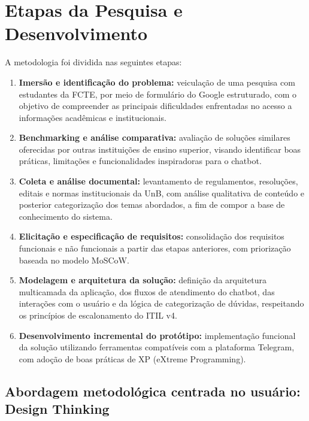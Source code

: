 \section{Etapas da Pesquisa e Desenvolvimento}

A metodologia foi dividida nas seguintes etapas:

\begin{enumerate}
    \item \textbf{Imersão e identificação do problema:} veiculação de uma pesquisa com estudantes da FCTE, por meio de formulário do Google estruturado, com o objetivo de compreender as principais dificuldades enfrentadas no acesso a informações acadêmicas e institucionais.

    \item \textbf{Benchmarking e análise comparativa:} avaliação de soluções similares oferecidas por outras instituições de ensino superior, visando identificar boas práticas, limitações e funcionalidades inspiradoras para o chatbot.

    \item \textbf{Coleta e análise documental:} levantamento de regulamentos, resoluções, editais e normas institucionais da UnB, com análise qualitativa de conteúdo e posterior categorização dos temas abordados, a fim de compor a base de conhecimento do sistema.

    \item \textbf{Elicitação e especificação de requisitos:} consolidação dos requisitos funcionais e não funcionais a partir das etapas anteriores, com priorização baseada no modelo MoSCoW.

    \item \textbf{Modelagem e arquitetura da solução:} definição da arquitetura multicamada da aplicação, dos fluxos de atendimento do chatbot, das interações com o usuário e da lógica de categorização de dúvidas, respeitando os princípios de escalonamento do ITIL v4.

    \item \textbf{Desenvolvimento incremental do protótipo:} implementação funcional da solução utilizando ferramentas compatíveis com a plataforma Telegram, com adoção de boas práticas de XP (eXtreme Programming).
\end{enumerate}

\subsection{Abordagem metodológica centrada no usuário: Design Thinking}

